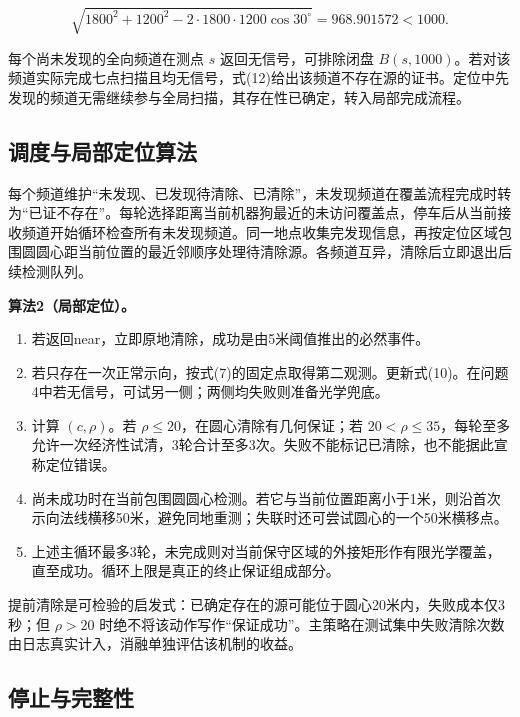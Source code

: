\documentclass[
  chinese,
  UTF8,
  a4paper,
  zihao=-4]{ctexart}
\providecommand{\tightlist}{%
  \setlength{\itemsep}{0pt}\setlength{\parskip}{0pt}}
\begin{document}
\[\sqrt{1800^2+1200^2-2\cdot1800\cdot1200\cos30^\circ}=968.901572<1000. \tag{12}\]

每个尚未发现的全向频道在测点 \(s\) 返回无信号，可排除闭盘
\(B(s,1000)\)。若对该频道实际完成七点扫描且均无信号，式(12)给出该频道不存在源的证书。定位中先发现的频道无需继续参与全局扫描，其存在性已确定，转入局部完成流程。

\subsection{调度与局部定位算法}\label{ux8c03ux5ea6ux4e0eux5c40ux90e8ux5b9aux4f4dux7b97ux6cd5}

每个频道维护``未发现、已发现待清除、已清除''，未发现频道在覆盖流程完成时转为``已证不存在''。每轮选择距离当前机器狗最近的未访问覆盖点，停车后从当前接收频道开始循环检查所有未发现频道。同一地点收集完发现信息，再按定位区域包围圆圆心距当前位置的最近邻顺序处理待清除源。各频道互异，清除后立即退出后续检测队列。

\textbf{算法2（局部定位）。}

\begin{enumerate}
\def\labelenumi{\arabic{enumi}.}
\tightlist
\item
  若返回near，立即原地清除，成功是由5米阈值推出的必然事件。
\item
  若只存在一次正常示向，按式(7)的固定点取得第二观测。更新式(10)。在问题4中若无信号，可试另一侧；两侧均失败则准备光学兜底。
\item
  计算 \((c,\rho)\)。若 \(\rho\le20\)，在圆心清除有几何保证；若
  \(20<\rho\le35\)，每轮至多允许一次经济性试清，3轮合计至多3次。失败不能标记已清除，也不能据此宣称定位错误。
\item
  尚未成功时在当前包围圆圆心检测。若它与当前位置距离小于1米，则沿首次示向法线横移50米，避免同地重测；失联时还可尝试圆心的一个50米横移点。
\item
  上述主循环最多3轮，未完成则对当前保守区域的外接矩形作有限光学覆盖，直至成功。循环上限是真正的终止保证组成部分。
\end{enumerate}

提前清除是可检验的启发式：已确定存在的源可能位于圆心20米内，失败成本仅3秒；但
\(\rho>20\)
时绝不将该动作写作``保证成功''。主策略在测试集中失败清除次数由日志真实计入，消融单独评估该机制的收益。

\subsection{停止与完整性}\label{ux505cux6b62ux4e0eux5b8cux6574ux6027}
\end{document}
